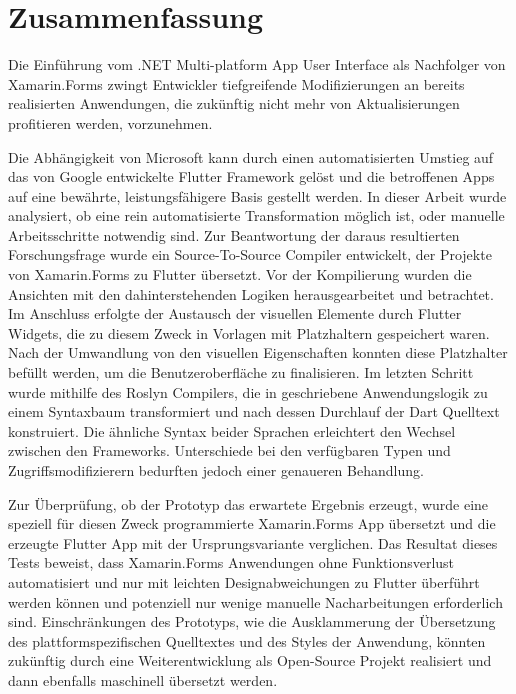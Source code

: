 
\chapter*{Zusammenfassung}
Die Einführung vom .NET Multi-platform App User Interface als Nachfolger von Xamarin.Forms zwingt Entwickler tiefgreifende Modifizierungen an bereits realisierten Anwendungen, die zukünftig nicht mehr von Aktualisierungen profitieren werden, vorzunehmen.

Die Abhängigkeit von Microsoft kann durch einen automatisierten Umstieg auf das von Google entwickelte Flutter Framework gelöst und die betroffenen Apps auf eine bewährte, leistungsfähigere Basis gestellt werden. In dieser Arbeit wurde analysiert, ob eine rein automatisierte Transformation möglich ist, oder manuelle Arbeitsschritte notwendig sind.  Zur Beantwortung der daraus resultierten Forschungsfrage wurde ein Source-To-Source Compiler entwickelt, der Projekte von Xamarin.Forms zu Flutter übersetzt. Vor der  Kompilierung wurden die Ansichten mit den dahinterstehenden Logiken herausgearbeitet und betrachtet.  Im Anschluss erfolgte der Austausch der visuellen Elemente durch Flutter Widgets, die zu diesem Zweck in Vorlagen mit Platzhaltern gespeichert waren. Nach der Umwandlung von den visuellen Eigenschaften konnten diese Platzhalter befüllt werden, um die Benutzeroberfläche zu finalisieren.  Im letzten Schritt wurde mithilfe des Roslyn Compilers, die in \Csharp{} geschriebene Anwendungslogik zu einem Syntaxbaum transformiert und nach dessen Durchlauf der Dart Quelltext konstruiert. Die ähnliche Syntax beider Sprachen erleichtert den Wechsel zwischen den Frameworks.  Unterschiede bei den verfügbaren Typen und Zugriffsmodifizierern bedurften jedoch einer genaueren Behandlung.

Zur Überprüfung,  ob der Prototyp das erwartete Ergebnis erzeugt, wurde eine speziell für diesen Zweck programmierte Xamarin.Forms App übersetzt und die erzeugte Flutter App mit der Ursprungsvariante verglichen. Das Resultat dieses Tests beweist, dass Xamarin.Forms Anwendungen ohne Funktionsverlust automatisiert und nur mit leichten Designabweichungen zu Flutter überführt werden können und potenziell nur wenige manuelle Nacharbeitungen erforderlich sind.  Einschränkungen des Prototyps, wie die Ausklammerung der Übersetzung des plattformspezifischen Quelltextes und des Styles der Anwendung, könnten zukünftig durch eine Weiterentwicklung als Open-Source Projekt realisiert und dann ebenfalls maschinell übersetzt werden.


